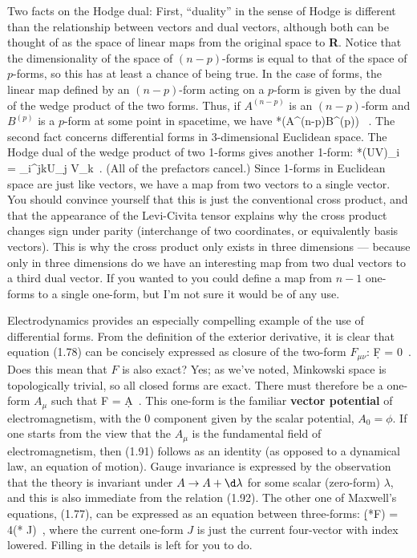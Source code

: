 \documentclass[12pt]{article}
\begin{document}
Two facts on the Hodge dual:  First, ``duality'' in the sense of Hodge is 
different than the relationship between vectors and dual vectors, although 
both can be thought of as the space of linear maps from the original space 
to {\bf R}.  Notice that the dimensionality of the space of $(n-p)$-forms
is equal to that of the space of $p$-forms, so this has at least a chance
of being true.  In the case of forms, the linear map defined by an 
$(n-p)$-form acting on a $p$-form is given by the dual of the wedge
product of the two forms.  Thus, if $A^{(n-p)}$ is an $(n-p)$-form and 
$B^{(p)}$ is a $p$-form at some point in spacetime, we have
\be
  *(A^{(n-p)}\wedge B^{(p)}) \ .\label{1.89}
\ee
The second fact concerns differential forms in 3-dimensional Euclidean
space.  The Hodge dual of the wedge product of two 1-forms gives another
1-form:
\be
  *(U\wedge V)_i = \epsilon_i{}^{jk}U_j V_k\ .\label{1.90}
\ee
(All of the prefactors cancel.)  Since 1-forms in Euclidean space are
just like vectors, we have a map from two vectors to a single vector.
You should convince yourself that this is just the conventional
cross product, and that the appearance of the Levi-Civita tensor
explains why the cross product changes sign under parity (interchange
of two coordinates, or equivalently basis vectors).  This is why the
cross product only exists in three dimensions --- because only in three
dimensions do we have an interesting map from two dual vectors to a
third dual vector.  If you wanted to you could define a map from
$n-1$ one-forms to a single one-form, but I'm not sure it would be
of any use.

Electrodynamics provides an especially compelling example of the use
of differential forms.  From the definition of the exterior derivative,
it is clear that equation (1.78) can be concisely expressed as closure
of the two-form $F_{\mu\nu}$:
\be
  \d F = 0\ .\label{1.91}
\ee
Does this mean that $F$ is also exact?  Yes; as we've noted, Minkowski
space is topologically trivial, so all closed forms are exact.  There
must therefore be a one-form $A_\mu$ such that
\be
  F = \d A\ .\label{1.92}
\ee
This one-form is the familiar {\bf vector potential} of electromagnetism,
with the $0$ component given by the scalar potential, $A_0 = \phi$. 
If one starts from the view that the $A_\mu$ is the fundamental field
of electromagnetism, then (1.91) follows as an identity (as opposed to a
dynamical law, an equation of motion).  Gauge invariance is expressed
by the observation that the theory is invariant under $A \rightarrow
A +\d \lambda$ for some scalar (zero-form) $\lambda$, and this is also 
immediate from the relation (1.92). The
other one of Maxwell's equations, (1.77), can be expressed as an equation
between three-forms:
\be
  \d(*F) = 4\pi(* J)\ ,\label{1.93}
\ee
where the current one-form $J$ is just the current four-vector with
index lowered.  Filling in the details is left for you to do.
\end{document}
